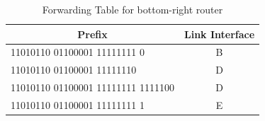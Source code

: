 \begin{exercise}[]
\begin{solution}
\begin{enumerate}
    \begin{table}[h]
      \centering
      \begin{tabular}{lc}
      \hline
      \multicolumn{1}{c}{\textbf{Prefix}} & \textbf{Link Interface} \\ \hline
      11010110 01100001 11111111 0    & B                       \\
      11010110 01100001 11111110      & D                       \\
      11010110 01100001 11111111 1111100 & D                      \\
      11010110 01100001 11111111 1 &E                      \\\hline
      \end{tabular}
      \caption{Forwarding Table for bottom-right router \label{tab:ex2-4}}
    \end{table}
  \end{enumerate}
  \end{solution}
  \label{ex2}
\end{exercise}


